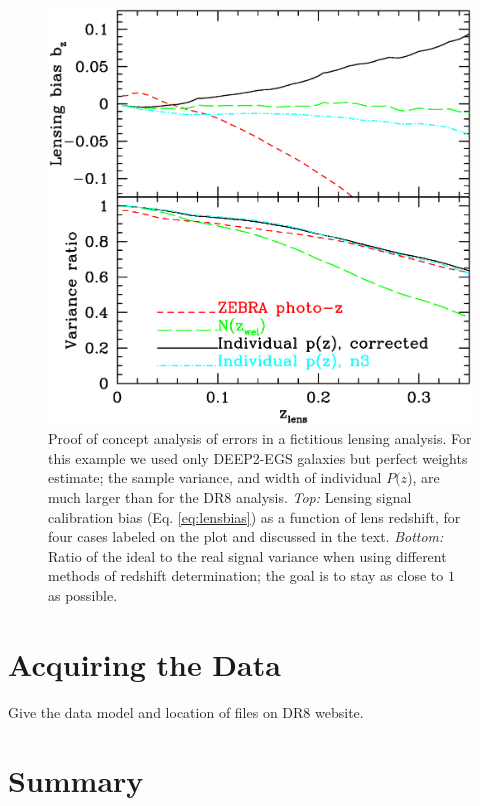 \documentclass[preprint]{aastex}
\newcommand{\pofz}{$P(z$)}
\begin{document}
\begin{figure} [h]\centering
    \includegraphics[scale=0.5]{figures/pz.egs.c3.paper.final.ps}

    \caption{ Proof of concept analysis of errors in a fictitious lensing
    analysis.  For this example we used only DEEP2-EGS galaxies but perfect
    weights estimate; the sample variance, and width of individual \pofz, are
    much larger than for the DR8 analysis.  {\em Top:} Lensing signal
    calibration bias (Eq.  \ref{eq:lensbias}) as a function of lens redshift,
    for four  cases labeled on the plot and discussed in the text.  {\em
    Bottom:}  Ratio of the ideal to the real signal variance when using
    different  methods of redshift determination; the goal is to stay as close
    to $1$  as possible.  \label{fig:simplebias}}

\end{figure}



\section{Acquiring the Data}

{\color{red} Give the data model and location  of files on DR8 website. }

\section{Summary}
\end{document}
